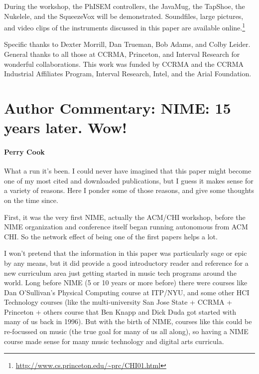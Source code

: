 During the workshop, the PhISEM controllers, the JavaMug, the TapShoe, the
Nukelele, and the SqueezeVox will be demonstrated.  Soundfiles, large pictures,
and video clips of the instruments discussed in this paper are available online.\footnote{\url{http://www.cs.princeton.edu/~prc/CHI01.html}}

\begin{acknowledgement}
Specific thanks to Dexter Morrill, Dan Trueman, Bob Adams, and Colby Leider. 
General thanks to all those at CCRMA, Princeton, and Interval Research for
wonderful collaborations.  This work was funded by CCRMA and the CCRMA Industrial
Affiliates Program, Interval Research, Intel, and the Arial Foundation.
\end{acknowledgement}



\section*{Author Commentary: NIME: 15 years later. Wow!}

\paragraph{Perry Cook}


What a run it's been.  I could never have imagined that this paper might become one of my most cited and downloaded publications, but I guess it makes sense for a variety of reasons.  Here I ponder some of those reasons, and give some thoughts on the time since.

First, it was the very first NIME, actually the ACM/CHI workshop, before the NIME organization and conference itself began running autonomous from ACM CHI.  So the network effect of being one of the first papers helps a lot.

I won't pretend that the information in this paper was particularly sage or epic by any means, but it did provide a good introductory reader and reference for a new curriculum area just getting started in music tech programs around the world.  Long before NIME (5 or 10 years or more before) there were courses like Dan O'Sullivan's Physical Computing course at ITP/NYU, and some other HCI Technology courses (like the multi-university San Jose State + CCRMA + Princeton + others course that Ben Knapp and Dick Duda \cite{Knapp:1995} got started with many of us back in 1996).  But with the birth of NIME, courses like this could be re-focussed on music (the true goal for many of us all along), so having a NIME course made sense for many music technology and digital arts curricula.

